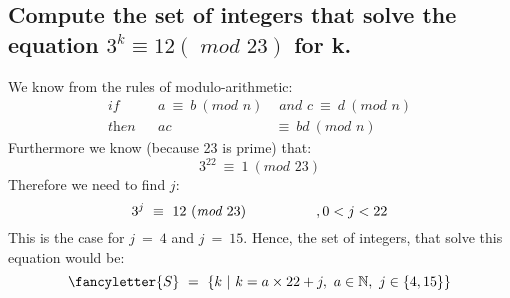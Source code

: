 \documentclass{report}
\begin{document}
		\subsection{Compute the set of integers that solve the equation $3^k \equiv 12 (\textit{ mod } 23)$ for k.}
		\startsubsection
			We know from the rules of modulo-arithmetic:
			\begin{align*}
				\textit{if} && a \ \equiv \ b \ (\textit{mod } n) &\textit{ and } c \ \equiv \ d \ (\textit{mod } n) \\
				\textit{then} && ac \ &\equiv \ bd \ (\textit{mod } n)
			\end{align*}
			Furthermore we know (because 23 is prime) that:
			\[
				3^{22} \ \equiv \ 1 \ (\textit{mod } 23)
			\]
			Therefore we need to find $j$:
			\[
				3^{j} \ \equiv \ 12 \ (\textit{mod } 23) \hspace*{5em}, 0 < j < 22
			\]
			This is the case for $j \ = \ 4$ and $j \ = \ 15$. Hence, the set of integers, that solve this equation would be:
			\[
				\fancyletter{S} \ = \ \{k \ | \ k = a \times 22 + j, \ a \in \mathbb{N}, \ j \in \{ 4, 15 \} \}
			\]
		\closesection
	\closesection
\end{document}
